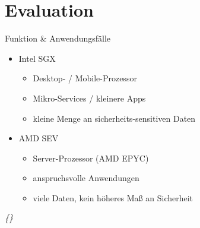 \documentclass{sdqbeamer}
\begin{document}
\section{Evaluation}

\begin{frame}{Funktion \& Anwendungsfälle}
	\begin{itemize}
		\item Intel SGX
		\begin{itemize}
			\item Desktop- / Mobile-Prozessor
			\item Mikro-Services / kleinere Apps
			\item kleine Menge an sicherheits-sensitiven Daten
		\end{itemize}
		\item AMD SEV
		\begin{itemize}
			\item Server-Prozessor (AMD EPYC)\\
			\item anspruchsvolle Anwendungen
			\item viele Daten, kein höheres Maß an Sicherheit
		\end{itemize}
	\end{itemize}
	\vfill
	\textit{\{\cite{mofrad}\}}
\end{frame}
\end{document}

